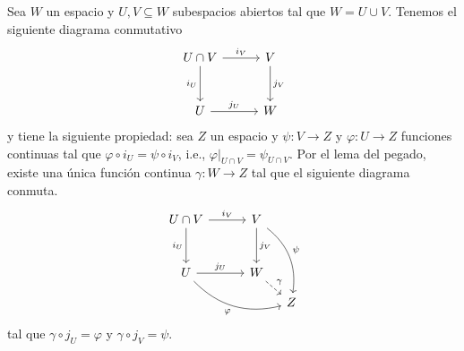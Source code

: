 \begin{ejemplo}
    Sea $W$ un espacio y $U,V\subseteq W$ subespacios abiertos tal que $W=U\cup V$. Tenemos el siguiente diagrama conmutativo
    \begin{equation*}
        \begin{tikzcd}[column sep=1cm, row sep=1cm]
            U\cap V\arrow["i_V",r]\arrow[d,"i_U"'] & V\arrow["j_V",d]\\
            U \arrow["j_U",r] & W
        \end{tikzcd}
    \end{equation*}
    y tiene la siguiente propiedad: sea $Z$ un espacio y $\psi:V\to Z$ y $\varphi:U\to Z$ funciones continuas tal que $\varphi\circ i_U=\psi\circ i_V$, i.e., $\varphi|_{U\cap V}=\psi_{U\cap V}$. Por el lema del pegado, existe una única función continua $\gamma:W\to Z$ tal que el siguiente diagrama conmuta.
    \begin{equation*}
        \begin{tikzcd}[column sep=1cm, row sep=1cm]
            U\cap V\arrow["i_V",r]\arrow[d,"i_U"'] & V\arrow["j_V",d]\arrow[ddr,"\psi", bend left]\\
            U\arrow[drr,"\varphi"', bend right] \arrow["j_U",r] & W\arrow[dr,dashed,"\gamma"]\\[-0.65cm]
            & &[-0.65cm] Z
        \end{tikzcd}
    \end{equation*}
    tal que $\gamma\circ j_U=\varphi$ y $\gamma\circ j_V=\psi$. 


\end{ejemplo}

